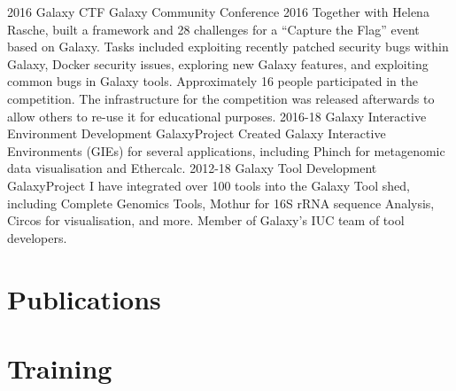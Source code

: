 \documentclass[]{shiltemann-cv}
\begin{document}
\begin{entrylist}
  \entry
    {2016}
    {Galaxy CTF}
    {Galaxy Community Conference 2016}
    {Together with Helena Rasche, built a framework and 28 challenges for a “Capture the Flag” event based on Galaxy. Tasks included exploiting recently patched security bugs within Galaxy, Docker security issues, exploring new Galaxy features, and exploiting common bugs in Galaxy tools. Approximately 16 people participated in the competition. The infrastructure for the competition was released afterwards to allow others to re-use it for educational purposes.}
   \entry
     {2016-18}
     {Galaxy Interactive Environment Development}
     {GalaxyProject}
     {Created Galaxy Interactive Environments (GIEs) for several applications, including Phinch for metagenomic data visualisation and Ethercalc.}
   \entry
    {2012-18}
    {Galaxy Tool Development}
    {GalaxyProject}
    {I have integrated over 100 tools into the Galaxy Tool shed, including Complete Genomics Tools, Mothur for 16S rRNA sequence Analysis, Circos for visualisation, and more. Member of Galaxy's IUC team of tool developers.}
\end{entrylist}

\section{Publications}

\nocite{*} %
\printbibliography[sorting=chronological, title={~}]

\section{Training}

%
\end{document}
